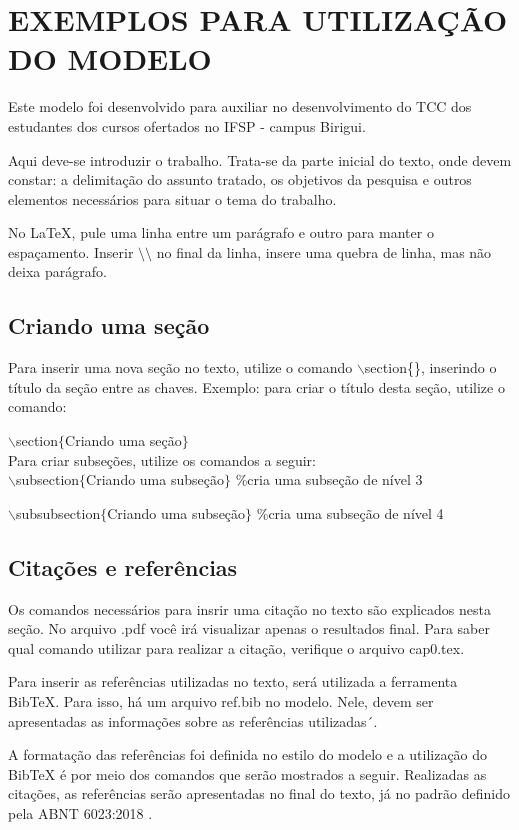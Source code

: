 \chapter{EXEMPLOS PARA UTILIZAÇÃO DO MODELO}
Este modelo foi desenvolvido para auxiliar no desenvolvimento do TCC dos estudantes dos cursos ofertados no IFSP - campus Birigui.

Aqui deve-se introduzir o trabalho. Trata-se da parte inicial do texto, onde devem constar: a delimitação do assunto tratado, os objetivos da pesquisa e outros elementos necessários para situar o tema do trabalho. 

No LaTeX, pule uma linha entre um parágrafo e outro para manter o espaçamento. Inserir $\setminus\setminus$ no final da linha, insere uma quebra de linha, mas não deixa parágrafo.\cite{adams1995}


\section{Criando uma seção} %
Para inserir uma nova seção no texto, utilize o comando $\backslash$section\{\}, inserindo o título da seção entre as chaves. Exemplo: para criar o título desta seção, utilize o comando:

$\backslash$section$\{$Criando uma seção$\}$\\

Para criar subseções, utilize os comandos a seguir:\\

$\backslash$subsection$\{$Criando uma subseção$\}$ \%cria uma subseção de nível 3

$\backslash$subsubsection$\{$Criando uma subseção$\}$ \%cria uma subseção de nível 4


\section{Citações e referências}
\onehalfspacing
Os comandos necessários para insrir uma citação no texto são explicados nesta seção. No arquivo .pdf você irá visualizar apenas o resultados final. Para saber qual comando utilizar para realizar a citação, verifique o arquivo cap0.tex.

Para inserir as referências utilizadas no texto, será utilizada a ferramenta BibTeX. Para isso, há um arquivo ref.bib no modelo. Nele, devem ser apresentadas as informações sobre as referências utilizadas´.

A formatação das referências foi definida no estilo do modelo e a utilização do BibTeX é por meio dos comandos que serão mostrados a seguir. Realizadas as citações, as referências serão apresentadas no final do texto, já no padrão definido pela ABNT 6023:2018 \cite{NBR6023}.

